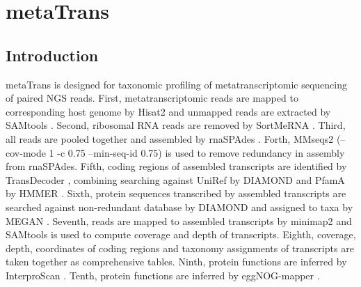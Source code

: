 \documentclass[11pt]{article}
\begin{document}
\begin{sloppypar}
\section{metaTrans}
\subsection{Introduction}
metaTrans is designed for taxonomic profiling of metatranscriptomic sequencing of paired NGS reads. 
First, metatranscriptomic reads are mapped to corresponding host genome by Hisat2 \parencite{kim2019graph} and unmapped reads are extracted by SAMtools \parencite{li2009sequence}. 
Second, ribosomal RNA reads are removed by SortMeRNA \parencite{kopylova2012sortmerna}. 
Third, all reads are pooled together and assembled by rnaSPAdes \parencite{bushmanova2019rnaspades}. 
Forth, MMseqs2 \parencite{steinegger2017mmseqs2} (--cov-mode 1 -c 0.75 --min-seq-id 0.75) is used to remove redundancy in assembly from rnaSPAdes. 
Fifth, coding regions of assembled transcripts are identified by TransDecoder \parencite{haas2016transdecoder}, combining searching against UniRef \parencite{suzek2007uniref} by DIAMOND \parencite{buchfink2015fast} and PfamA \parencite{mistry2021pfam} by HMMER \parencite{eddy1992hmmer}. 
Sixth, protein sequences transcribed by assembled transcripts are searched against non-redundant database by DIAMOND \parencite{buchfink2015fast} and assigned to taxa by MEGAN \parencite{huson2007megan}. 
Seventh, reads are mapped to assembled transcripts by minimap2 \parencite{li2018minimap2} and SAMtools is used to compute coverage and depth of transcripts. 
Eighth, coverage, depth, coordinates of coding regions and taxonomy assignments of transcripts are taken together as comprehensive tables. 
Ninth, protein functions are inferred by InterproScan \parencite{jones2014interproscan}. 
Tenth, protein functions are inferred by eggNOG-mapper \parencite{cantalapiedra2021eggnog}. 

\end{sloppypar}
\end{document}
